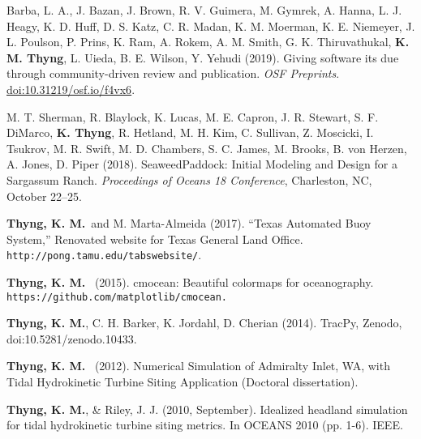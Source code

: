 \documentclass[10pt,letterpaper]{article}
\newcommand{\kmt}{\textbf{K. M. Thyng}}
\newcommand{\tkm}{\textbf{Thyng, K. M.}}
\newcommand{\kt}{\textbf{K. Thyng}}
\renewenvironment{itemize}{
  \begin{list}{}{
    \setlength{\leftmargin}{1.5em}
    \setlength{\itemsep}{0.25em}
    \setlength{\parskip}{0pt}
    \setlength{\parsep}{0.25em}
  }
}{
  \end{list}
}
\begin{document}
\begin{itemize}

\item Barba, L. A., J. Bazan, J. Brown, R. V. Guimera, M. Gymrek, A. Hanna, L. J. Heagy, K. D. Huff, D. S. Katz, C. R. Madan, K. M. Moerman, K. E. Niemeyer, J. L. Poulson, P. Prins, K. Ram, A. Rokem, A. M. Smith, G. K. Thiruvathukal, \kmt, L. Uieda, B. E. Wilson, Y. Yehudi (2019). Giving software its due through community-driven review and publication. \textit{OSF Preprints}. \href{https://doi.org/10.31219/osf.io/f4vx6}{doi:10.31219/osf.io/f4vx6}.

\item M. T. Sherman, R. Blaylock, K. Lucas, M. E. Capron, J. R. Stewart, S. F. DiMarco, \kt, R. Hetland, M. H. Kim, C. Sullivan, Z. Moscicki, I. Tsukrov, M. R. Swift, M. D. Chambers, S. C. James, M. Brooks, B. von Herzen, A. Jones, D. Piper (2018). SeaweedPaddock: Initial Modeling and Design for a Sargassum Ranch. \textit{Proceedings of Oceans 18 Conference}, Charleston, NC, October 22--25.

\item \tkm~and M. Marta-Almeida (2017). ``Texas Automated Buoy System,'' Renovated website for Texas General Land Office. \verb+http://pong.tamu.edu/tabswebsite/+.

\item \tkm~ (2015). cmocean: Beautiful colormaps for oceanography. \\ \verb+https://github.com/matplotlib/cmocean.+

\item \tkm, C. H. Barker, K. Jordahl, D. Cherian (2014). TracPy, Zenodo, doi:10.5281/zenodo.10433.

\item \tkm~ (2012). Numerical Simulation of Admiralty Inlet, WA, with Tidal Hydrokinetic Turbine Siting Application (Doctoral dissertation).

\item \tkm, \& Riley, J. J. (2010, September). Idealized headland simulation for tidal hydrokinetic turbine siting metrics. In OCEANS 2010 (pp. 1-6). IEEE.

\end{itemize}
\end{document}
